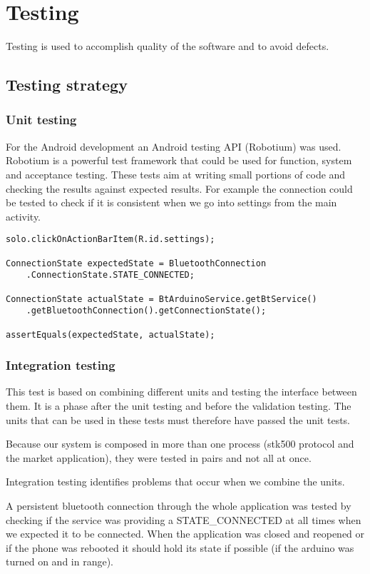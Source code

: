 \chapter{Testing}
	Testing is used to accomplish quality of the software and to avoid defects.
	
	\section{Testing strategy}
		\subsection{Unit testing}
			For the Android development an Android testing API (Robotium) was used.
			Robotium is a powerful test framework that could be used for function, system and acceptance testing.
			These tests aim at writing small portions of code and checking the results against expected results.
			For example the connection could be tested to check if it is consistent when we go into settings from the main activity.\\

			\begin{lstlisting}
solo.clickOnActionBarItem(R.id.settings);

ConnectionState expectedState = BluetoothConnection
	.ConnectionState.STATE_CONNECTED;
	
ConnectionState actualState = BtArduinoService.getBtService()
	.getBluetoothConnection().getConnectionState();

assertEquals(expectedState, actualState);
			\end{lstlisting}

		\subsection{Integration testing}
			This test is based on combining different units and testing the interface between them. It is a phase after the unit testing and before the validation testing. The units that can be used in these tests must therefore have passed the unit tests.

			Because our system is composed in more than one process (stk500 protocol and the market application), they
			were tested in pairs and not all at once.

			Integration testing identifies problems that occur when we combine the units.

			A persistent bluetooth connection through the whole application was tested by checking if the service was providing a STATE\_CONNECTED at all times when we expected it to be connected. When the application was closed and reopened or if the phone was rebooted it should hold its state if possible (if the arduino was turned on and in range). 

